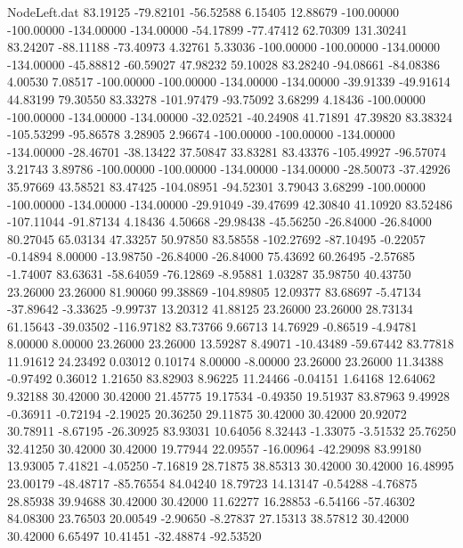 \begin{filecontents}{NodeLeft.dat}
  83.19125  -79.82101  -56.52588     6.15405   12.88679 -100.00000 -100.00000 -134.00000 -134.00000  -54.17899  -77.47412   62.70309  131.30241
  83.24207  -88.11188  -73.40973     4.32761    5.33036 -100.00000 -100.00000 -134.00000 -134.00000  -45.88812  -60.59027   47.98232   59.10028
  83.28240  -94.08661  -84.08386     4.00530    7.08517 -100.00000 -100.00000 -134.00000 -134.00000  -39.91339  -49.91614   44.83199   79.30550
  83.33278 -101.97479  -93.75092     3.68299    4.18436 -100.00000 -100.00000 -134.00000 -134.00000  -32.02521  -40.24908   41.71891   47.39820
  83.38324 -105.53299  -95.86578     3.28905    2.96674 -100.00000 -100.00000 -134.00000 -134.00000  -28.46701  -38.13422   37.50847   33.83281
  83.43376 -105.49927  -96.57074     3.21743    3.89786 -100.00000 -100.00000 -134.00000 -134.00000  -28.50073  -37.42926   35.97669   43.58521
  83.47425 -104.08951  -94.52301     3.79043    3.68299 -100.00000 -100.00000 -134.00000 -134.00000  -29.91049  -39.47699   42.30840   41.10920
  83.52486 -107.11044  -91.87134     4.18436    4.50668  -29.98438  -45.56250  -26.84000  -26.84000   80.27045   65.03134   47.33257   50.97850
  83.58558 -102.27692  -87.10495    -0.22057   -0.14894    8.00000  -13.98750  -26.84000  -26.84000   75.43692   60.26495   -2.57685   -1.74007
  83.63631  -58.64059  -76.12869    -8.95881    1.03287   35.98750   40.43750   23.26000   23.26000   81.90060   99.38869 -104.89805   12.09377
  83.68697   -5.47134  -37.89642    -3.33625   -9.99737   13.20312   41.88125   23.26000   23.26000   28.73134   61.15643  -39.03502 -116.97182
  83.73766    9.66713   14.76929    -0.86519   -4.94781    8.00000    8.00000   23.26000   23.26000   13.59287    8.49071  -10.43489  -59.67442
  83.77818   11.91612   24.23492     0.03012    0.10174    8.00000   -8.00000   23.26000   23.26000   11.34388   -0.97492    0.36012    1.21650
  83.82903    8.96225   11.24466    -0.04151    1.64168   12.64062    9.32188   30.42000   30.42000   21.45775   19.17534   -0.49350   19.51937
  83.87963    9.49928   -0.36911    -0.72194   -2.19025   20.36250   29.11875   30.42000   30.42000   20.92072   30.78911   -8.67195  -26.30925
  83.93031   10.64056    8.32443    -1.33075   -3.51532   25.76250   32.41250   30.42000   30.42000   19.77944   22.09557  -16.00964  -42.29098
  83.99180   13.93005    7.41821    -4.05250   -7.16819   28.71875   38.85313   30.42000   30.42000   16.48995   23.00179  -48.48717  -85.76554
  84.04240   18.79723   14.13147    -0.54288   -4.76875   28.85938   39.94688   30.42000   30.42000   11.62277   16.28853   -6.54166  -57.46302
  84.08300   23.76503   20.00549    -2.90650   -8.27837   27.15313   38.57812   30.42000   30.42000    6.65497   10.41451  -32.48874  -92.53520

\end{filecontents}

